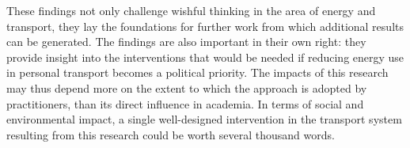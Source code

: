 These findings not only challenge wishful thinking in the area of energy and
transport, they lay the
foundations for further work from which additional results can be
generated. The findings are also important in their own right: they
provide insight into the interventions that would be needed if reducing energy
use in personal transport
becomes a political priority. The impacts of this research may thus
depend more on the extent to which the approach is adopted by practitioners,
than its direct influence in
academia. In terms of social and environmental impact, a single well-designed
intervention in the transport system resulting from this research could be worth
several thousand words.

